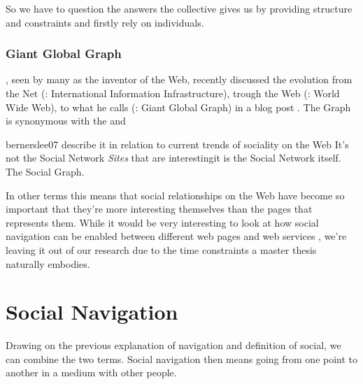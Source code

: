 So we have to question the answers the collective gives us by providing
structure and constraints and firstly rely on individuals.

%

\subsubsection{Giant Global Graph}
\citeauthor{bernerslee07}, seen by many as the inventor of the Web,
recently discussed the evolution from the Net (: International
Information Infrastructure), trough the Web (: World Wide Web),
to what he calls  (: Giant Global Graph) in a
blog post \citeyearpar{bernerslee07}. The Graph is synonymous with the
%
and
\begin{fullquote}{bernerslee07}{%
  describe it in relation to current trends of sociality on the Web}
    It's not the Social Network \emph{Sites} that are interesting\dash{}it is
    the Social Network itself. The Social Graph.
\end{fullquote}

In other terms this means that social relationships on the Web have become so
important that they're more interesting themselves than the pages that
represents them. While it would be very interesting to look at how social
navigation can be enabled between different web pages and web services%
,
we're leaving it out of our research due to the time constraints a master
thesis naturally embodies.

\section{Social Navigation}
\label{section:background.social.navigation}
Drawing on the previous explanation of navigation and definition of social, we
can combine the two terms. Social navigation then means going from one point
to another in a medium with other people.

